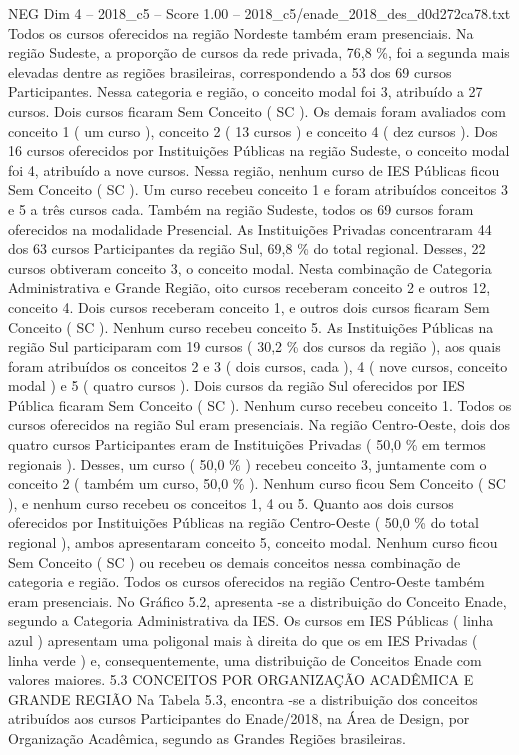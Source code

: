 \begin{textsample}{NEG Dim 4 – 2018\_c5 – Score 1.00 – 2018\_c5/enade\_2018\_des\_d0d272ca78.txt}
Todos os cursos oferecidos na região Nordeste também eram presenciais.
Na região Sudeste, a proporção de cursos da rede privada, 76,8 \%, foi a segunda mais elevadas dentre as regiões brasileiras, correspondendo a 53 dos 69 cursos Participantes.
Nessa categoria e região, o conceito modal foi 3, atribuído a 27 cursos.
Dois cursos ficaram Sem Conceito ( SC ).
Os demais foram avaliados com conceito 1 ( um curso ), conceito 2 ( 13 cursos ) e conceito 4 ( dez cursos ).
Dos 16 cursos oferecidos por Instituições Públicas na região Sudeste, o conceito modal foi 4, atribuído a nove cursos.
Nessa região, nenhum curso de IES Públicas ficou Sem Conceito ( SC ).
Um curso recebeu conceito 1 e foram atribuídos conceitos 3 e 5 a três cursos cada.
Também na região Sudeste, todos os 69 cursos foram oferecidos na modalidade Presencial.
As Instituições Privadas concentraram 44 dos 63 cursos Participantes da região Sul, 69,8 \% do total regional.
Desses, 22 cursos obtiveram conceito 3, o conceito modal.
Nesta combinação de Categoria Administrativa e Grande Região, oito cursos receberam conceito 2 e outros 12, conceito 4.
Dois cursos receberam conceito 1, e outros dois cursos ficaram Sem Conceito ( SC ).
Nenhum curso recebeu conceito 5.
As Instituições Públicas na região Sul participaram com 19 cursos ( 30,2 \% dos cursos da região ), aos quais foram atribuídos os conceitos 2 e 3 ( dois cursos, cada ), 4 ( nove cursos, conceito modal ) e 5 ( quatro cursos ).
Dois cursos da região Sul oferecidos por IES Pública ficaram Sem Conceito ( SC ).
Nenhum curso recebeu conceito 1.
Todos os cursos oferecidos na região Sul eram presenciais.
Na região Centro-Oeste, dois dos quatro cursos Participantes eram de Instituições Privadas ( 50,0 \% em termos regionais ).
Desses, um curso ( 50,0 \% ) recebeu conceito 3, juntamente com o conceito 2 ( também um curso, 50,0 \% ).
Nenhum curso ficou Sem Conceito ( SC ), e nenhum curso recebeu os conceitos 1, 4 ou 5.
Quanto aos dois cursos oferecidos por Instituições Públicas na região Centro-Oeste ( 50,0 \% do total regional ), ambos apresentaram conceito 5, conceito modal.
Nenhum curso ficou Sem Conceito ( SC ) ou recebeu os demais conceitos nessa combinação de categoria e região.
Todos os cursos oferecidos na região Centro-Oeste também eram presenciais.
No Gráfico 5.2, apresenta -se a distribuição do Conceito Enade, segundo a Categoria Administrativa da IES.
Os cursos em IES Públicas ( linha azul ) apresentam uma poligonal mais à direita do que os em IES Privadas ( linha verde ) e, consequentemente, uma distribuição de Conceitos Enade com valores maiores. 5.3 CONCEITOS POR ORGANIZAÇÃO ACADÊMICA E GRANDE REGIÃO Na Tabela 5.3, encontra -se a distribuição dos conceitos atribuídos aos cursos Participantes do Enade/2018, na Área de Design, por Organização Acadêmica, segundo as Grandes Regiões brasileiras.

\end{textsample}
